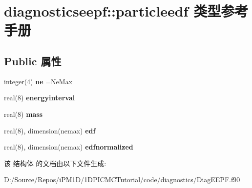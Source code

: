 \hypertarget{structdiagnosticseepf_1_1particleedf}{}\section{diagnosticseepf\+::particleedf 类型参考手册}
\label{structdiagnosticseepf_1_1particleedf}
\subsection*{Public 属性}
\begin{DoxyCompactItemize}
\item 
\mbox{\label{structdiagnosticseepf_1_1particleedf_a87e8137a9674b126e658c189c2aef5b1}} 
integer(4) {\bfseries ne} =Ne\+Max
\item 
\mbox{\label{structdiagnosticseepf_1_1particleedf_a624cd555c89cb442e877b785ca1e8f8e}} 
real(8) {\bfseries energyinterval}
\item 
\mbox{\label{structdiagnosticseepf_1_1particleedf_a80fa7f9a8c98811e69e880b8f75e76d5}} 
real(8) {\bfseries mass}
\item 
\mbox{\label{structdiagnosticseepf_1_1particleedf_a246beffa0865aa76fbfcf3900c4a77ec}} 
real(8), dimension(nemax) {\bfseries edf}
\item 
\mbox{\label{structdiagnosticseepf_1_1particleedf_a76d573ca587b397e4f155d41aa007452}} 
real(8), dimension(nemax) {\bfseries edfnormalized}
\end{DoxyCompactItemize}


该 结构体 的文档由以下文件生成\+:\begin{DoxyCompactItemize}
\item 
D\+:/\+Source/\+Repos/i\+P\+M1\+D/1\+D\+P\+I\+C\+M\+C\+Tutorial/code/diagnostics/Diag\+E\+E\+P\+F.\+f90\end{DoxyCompactItemize}

